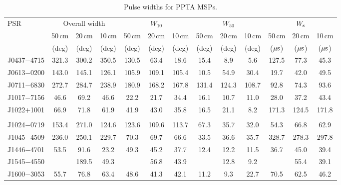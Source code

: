 \documentclass[useAMS,usenatbib]{mn2e}
\begin{document}
\begin{table}
\begin{center}
\caption{Pulse widths for PPTA MSPs.}
\label{tableWidth}
\begin{tabular}{lcccccccccccc}
\hline
PSR              & \multicolumn{3}{c}{Overall width} &        & $W_{10}$&        &       &  $W_{50}$ &      &       &  $W_{\rm{s}}$&       \\
								 &  50\,cm & 20\,cm & 10\,cm         & 50\,cm & 20\,cm  & 10\,cm & 50\,cm& 20\,cm    &10\,cm&50\,cm &  20\,cm      &10\,cm \\
								 &  (deg) &  (deg) & (deg)           & (deg)  & (deg)   & (deg)  & (deg) &   (deg)   & (deg)& ($\rm{\mu s}$) & ($\rm{\mu s}$) & ($\rm{\mu s}$)  \\
\hline
J0437$-$4715     & 321.3 &  300.2 &  350.5  &   130.5     & 63.4   & 18.6   & 15.4  & 8.9   & 5.6     &  127.5  &  77.3   & 45.3    \\
J0613$-$0200     & 143.0 &  145.1 &  126.1  &   105.9     & 109.1  & 105.4  & 10.5  & 54.9  & 30.4    &  19.7   &  42.0   & 49.5    \\
J0711$-$6830     & 272.7 &  284.7 &  238.9  &   180.9     & 168.2  & 167.8  & 131.4 & 124.3 & 108.7   &  92.8   &  74.3   & 93.6    \\
J1017$-$7156     & 46.6  &  69.2  &  46.6   &   22.2      & 21.7   & 34.4   & 16.1  & 10.7  & 11.0    &  28.0   &  37.2   & 43.4    \\
J1022$+$1001     & 66.9  &  71.8  &  61.9   &   41.9      & 43.0   & 35.8   & 16.5  & 21.1  & 8.2     &  171.3  &  124.5  & 171.8   \\
	               &       &        &         &             &        &        &       &       &         &         &         &         \\     
J1024$-$0719     & 153.4 &  271.0 &  124.6  &   123.6     & 109.6  & 113.7  & 67.3  & 35.7  & 32.0    &  54.3   &  66.8   & 62.9    \\
J1045$-$4509     & 236.0 &  250.1 &  229.7  &   70.3      & 69.7   & 66.6   & 33.5  & 36.6  & 35.7    &  328.7  &  278.3  & 297.8   \\
J1446$-$4701     & 53.5  &  91.6  &  23.2   &   49.3      & 45.2   & 37.7   & 12.4  & 12.2  & 11.5    &  36.7   &  45.0   & 39.4    \\
J1545$-$4550     &       &  189.5 &  49.3   &             & 56.8   & 43.9   &       & 12.8  & 9.2     &         &  55.4   & 39.1    \\
J1600$-$3053     & 55.7  &  76.8  &  63.4   &   48.6      & 41.3   & 42.1   & 11.2  & 9.3   & 22.7    &  70.5   &  62.5   & 46.2    \\

\end{tabular}
\end{center}
\end{table}
\end{document}
